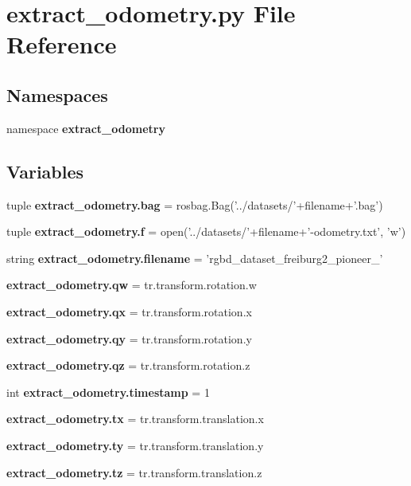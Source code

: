 \section{extract\-\_\-odometry.\-py \-File \-Reference}
\label{extract__odometry_8py}
\subsection*{\-Namespaces}
\begin{DoxyCompactItemize}
\item 
namespace {\bf extract\-\_\-odometry}
\end{DoxyCompactItemize}
\subsection*{\-Variables}
\begin{DoxyCompactItemize}
\item 
tuple {\bf extract\-\_\-odometry.\-bag} = rosbag.\-Bag('../datasets/'+filename+'.bag')
\item 
tuple {\bf extract\-\_\-odometry.\-f} = open('../datasets/'+filename+'-\/odometry.\-txt', 'w')
\item 
string {\bf extract\-\_\-odometry.\-filename} = 'rgbd\-\_\-dataset\-\_\-freiburg2\-\_\-pioneer\-\_'
\item 
{\bf extract\-\_\-odometry.\-qw} = tr.\-transform.\-rotation.\-w
\item 
{\bf extract\-\_\-odometry.\-qx} = tr.\-transform.\-rotation.\-x
\item 
{\bf extract\-\_\-odometry.\-qy} = tr.\-transform.\-rotation.\-y
\item 
{\bf extract\-\_\-odometry.\-qz} = tr.\-transform.\-rotation.\-z
\item 
int {\bf extract\-\_\-odometry.\-timestamp} = 1
\item 
{\bf extract\-\_\-odometry.\-tx} = tr.\-transform.\-translation.\-x
\item 
{\bf extract\-\_\-odometry.\-ty} = tr.\-transform.\-translation.\-y
\item 
{\bf extract\-\_\-odometry.\-tz} = tr.\-transform.\-translation.\-z
\end{DoxyCompactItemize}
